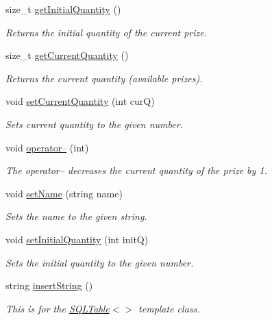 \begin{CompactItemize}
size\_\-t \hyperlink{classgiftDetails_giftDetailsa6}{get\-Initial\-Quantity} ()
\begin{CompactList}\small\item\em Returns the initial quantity of the current prize.\item\end{CompactList}\item 
size\_\-t \hyperlink{classgiftDetails_giftDetailsa7}{get\-Current\-Quantity} ()
\begin{CompactList}\small\item\em Returns the current quantity (available prizes).\item\end{CompactList}\item 
void \hyperlink{classgiftDetails_giftDetailsa8}{set\-Current\-Quantity} (int cur\-Q)
\begin{CompactList}\small\item\em Sets current quantity to the given number.\item\end{CompactList}\item 
void \hyperlink{classgiftDetails_giftDetailsa9}{operator--} (int)
\begin{CompactList}\small\item\em The operator-- decreases the current quantity of the prize by 1.\item\end{CompactList}\item 
void \hyperlink{classgiftDetails_giftDetailsa10}{set\-Name} (string name)
\begin{CompactList}\small\item\em Sets the name to the given string.\item\end{CompactList}\item 
void \hyperlink{classgiftDetails_giftDetailsa11}{set\-Initial\-Quantity} (int init\-Q)
\begin{CompactList}\small\item\em Sets the initial quantity to the given number.\item\end{CompactList}\item 
string \hyperlink{classgiftDetails_giftDetailsa12}{insert\-String} ()
\begin{CompactList}\small\item\em This is for the \hyperlink{classSQLTable}{SQLTable}$<$$>$ template class.\item\end{CompactList}\item 

\end{CompactItemize}
